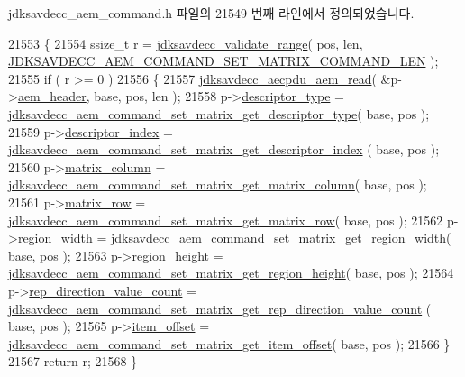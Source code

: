 jdksavdecc\+\_\+aem\+\_\+command.\+h 파일의 21549 번째 라인에서 정의되었습니다.


\begin{DoxyCode}
21553 \{
21554     ssize\_t r = \hyperlink{group__util_ga9c02bdfe76c69163647c3196db7a73a1}{jdksavdecc\_validate\_range}( pos, len, 
      \hyperlink{group__command__set__matrix_ga5ad958d8f2ee7694dbb39755b4df28c8}{JDKSAVDECC\_AEM\_COMMAND\_SET\_MATRIX\_COMMAND\_LEN} );
21555     \textcolor{keywordflow}{if} ( r >= 0 )
21556     \{
21557         \hyperlink{group__aecpdu__aem_gae2421015dcdce745b4f03832e12b4fb6}{jdksavdecc\_aecpdu\_aem\_read}( &p->\hyperlink{structjdksavdecc__aem__command__set__matrix_ae1e77ccb75ff5021ad923221eab38294}{aem\_header}, base, pos, len );
21558         p->\hyperlink{structjdksavdecc__aem__command__set__matrix_ab7c32b6c7131c13d4ea3b7ee2f09b78d}{descriptor\_type} = 
      \hyperlink{group__command__set__matrix_ga7d17c2e51205c6a76b6a32c4720b82e8}{jdksavdecc\_aem\_command\_set\_matrix\_get\_descriptor\_type}(
       base, pos );
21559         p->\hyperlink{structjdksavdecc__aem__command__set__matrix_a042bbc76d835b82d27c1932431ee38d4}{descriptor\_index} = 
      \hyperlink{group__command__set__matrix_ga2885acb0f0ace45fff15b2ec4c0a7f73}{jdksavdecc\_aem\_command\_set\_matrix\_get\_descriptor\_index}
      ( base, pos );
21560         p->\hyperlink{structjdksavdecc__aem__command__set__matrix_aa7db0d3d8cd5b895d1f9bf81b816fd66}{matrix\_column} = 
      \hyperlink{group__command__set__matrix_ga39f9be0a23bef37f0c2141732a64f310}{jdksavdecc\_aem\_command\_set\_matrix\_get\_matrix\_column}( 
      base, pos );
21561         p->\hyperlink{structjdksavdecc__aem__command__set__matrix_a8cb269dcca919ec8232ec33a09477c07}{matrix\_row} = 
      \hyperlink{group__command__set__matrix_ga87050fb9816d90a43c37223d823eea96}{jdksavdecc\_aem\_command\_set\_matrix\_get\_matrix\_row}( base, pos
       );
21562         p->\hyperlink{structjdksavdecc__aem__command__set__matrix_a87453b735ebc871f58f507139df28b89}{region\_width} = 
      \hyperlink{group__command__set__matrix_ga3d74ef8efa3dda8319f7078c56c8006c}{jdksavdecc\_aem\_command\_set\_matrix\_get\_region\_width}( base,
       pos );
21563         p->\hyperlink{structjdksavdecc__aem__command__set__matrix_afac2ca21b44ee4f90b555f2609321c60}{region\_height} = 
      \hyperlink{group__command__set__matrix_gacbf4c7b3a1b6acb68446933156c97d3b}{jdksavdecc\_aem\_command\_set\_matrix\_get\_region\_height}( 
      base, pos );
21564         p->\hyperlink{structjdksavdecc__aem__command__set__matrix_ad43e01e546f8431400084a400bc17c47}{rep\_direction\_value\_count} = 
      \hyperlink{group__command__set__matrix_gaf29492eae72d4e81e6bb4207c7b7666a}{jdksavdecc\_aem\_command\_set\_matrix\_get\_rep\_direction\_value\_count}
      ( base, pos );
21565         p->\hyperlink{structjdksavdecc__aem__command__set__matrix_afbb15486d86fc9c3680a6864ddbc029b}{item\_offset} = 
      \hyperlink{group__command__set__matrix_gaa2cf14d5f5d7ee2358b56a482922c85e}{jdksavdecc\_aem\_command\_set\_matrix\_get\_item\_offset}( base, 
      pos );
21566     \}
21567     \textcolor{keywordflow}{return} r;
21568 \}
\end{DoxyCode}


